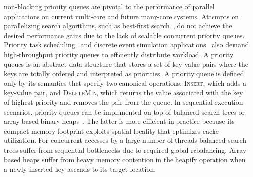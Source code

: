 \documentclass[10pt,journal,letterpaper,compsoc]{IEEEtran}
\begin{document}
 non-blocking priority queues are pivotal to the performance of parallel applications on current multi-core and future many-core systems.
Attempts on parallelizing search algorithms, such as best-first search~\cite{burns2010best}, do not achieve the desired performance gains due to the lack of scalable concurrent priority queues.
Priority task scheduling~\cite{wimmer2013data} and discrete event simulation applications~\cite{linden2013skiplist} also demand high-throughput priority queues to efficiently distribute workload.
A priority queues is an abstract data structure that stores a set of key-value pairs where the keys are totally ordered and interpreted as priorities. 
A priority queue is defined only by its semantics that specify two canonical operations: \textsc{Insert}, which adds a key-value pair, and \textsc{DeleteMin}, which returns the value associated with the key of highest priority and removes the pair from the queue.
In sequential execution scenarios, priority queues can be implemented on top of balanced search trees or array-based binary heaps~\cite{cormen2001introduction}. 
The latter is more efficient in practice because its compact memory footprint exploits spatial locality that optimizes cache utilization. 
For concurrent accesses by a large number of threads balanced search trees suffer from sequential bottlenecks due to required global rebalancing.
Array-based heaps suffer from heavy memory contention in the heapify operation when a newly inserted key ascends to its target location.
\end{document}

